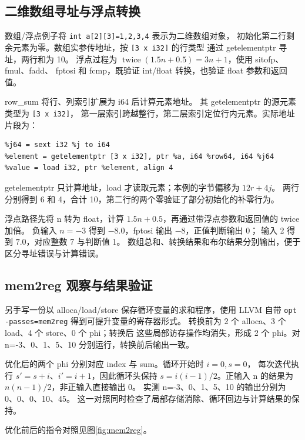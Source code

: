 \subsection{二维数组寻址与浮点转换}

数组/浮点例子将 \texttt{int a[2][3]={{1,2,3},{4}}} 表示为二维数组对象，
初始化第二行剩余元素为零。数组实参传地址，按 \texttt{[3 x i32]} 的行类型
通过 getelementptr 寻址，两行和为 10。
浮点过程为 $\operatorname{twice}(1.5n+0.5)=3n+1$，使用 sitofp、fmul、fadd、
fptosi 和 fcmp，既验证 int/float 转换，也验证 float 参数和返回值。

row\_sum 将行、列索引扩展为 i64 后计算元素地址。
其 getelementptr 的源元素类型为 \texttt{[3 x i32]}，
第一层索引跨越整行，第二层索引定位行内元素。实际地址片段为：
\par\vspace{0.7\baselineskip}\noindent\begin{minipage}[t]{\linewidth}
\begin{lstlisting}
%j64 = sext i32 %j to i64
%element = getelementptr [3 x i32], ptr %a, i64 %row64, i64 %j64
%value = load i32, ptr %element, align 4
\end{lstlisting}
\end{minipage}\par\vspace{0.5\baselineskip}
getelementptr 只计算地址，load 才读取元素；本例的字节偏移为 $12r+4j$。
两行分别得到 6 和 4，合计 10，第二行的两个零验证了部分初始化的补零行为。

浮点路径先将 n 转为 float，计算 $1.5n+0.5$，再通过带浮点参数和返回值的 twice 加倍。
负输入 $n=-3$ 得到 $-8.0$，fptosi 输出 $-8$，正值判断输出 0；
输入 2 得到 $7.0$，对应整数 7 与判断值 1。
数组总和、转换结果和布尔结果分别输出，便于区分寻址错误与计算错误。


\subsection{mem2reg 观察与结果验证}
另手写一份以 alloca/load/store 保存循环变量的求和程序，使用 LLVM 自带
\texttt{opt -passes=mem2reg} 得到可提升变量的寄存器形式。
转换前为 2 个 alloca、3 个 load、4 个 store、0 个 phi；转换后
这些局部访存操作均消失，形成 2 个 phi。对 n=-3、0、1、5、10
分别运行，转换前后输出一致。

优化后的两个 phi 分别对应 index 与 sum。循环开始时 $i=0,s=0$，
每次迭代执行 $s'=s+i$、$i'=i+1$，因此循环头保持
$s=i(i-1)/2$。正输入 n 的结果为 $n(n-1)/2$，非正输入直接输出 0。
实测 n=-3、0、1、5、10 的输出分别为 0、0、0、10、45。
这一对照同时检查了局部存储消除、循环回边与计算结果的保持。

优化前后的指令对照见图\ref{fig:mem2reg}。

